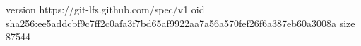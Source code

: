 version https://git-lfs.github.com/spec/v1
oid sha256:ee5addcbf9c7ff2c0afa3f7bd65af9922aa7a56a570fef26f6a387eb60a3008a
size 87544
